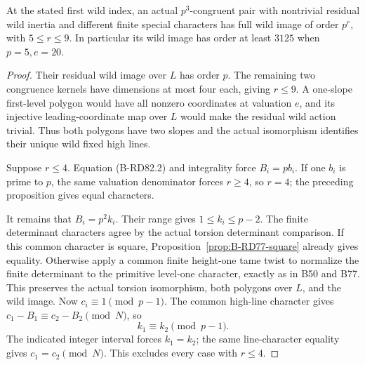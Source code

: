 \begin{theorem}
\label{thm:B-RD82}
At the stated first wild index, an actual \(p^3\)-congruent
pair with nontrivial residual wild inertia and different
finite special characters has full wild image of order
\(p^r\), with \(5\le r\le9\). In particular its wild
image has order at least \(3125\) when \(p=5,e=20\).
\end{theorem}
\begin{proof}
Their residual wild image over \(L\) has order \(p\).
The remaining two congruence kernels have dimensions at
most four each, giving \(r\le9\). A one-slope first-level
polygon would have all nonzero coordinates at valuation
\(e\), and its injective leading-coordinate map over \(L\)
would make the residual wild action trivial. Thus both
polygons have two slopes and the actual isomorphism
identifies their unique wild fixed high lines.

Suppose \(r\le4\). Equation (B-RD82.2) and integrality
force \(B_i=pb_i\). If one \(b_i\) is prime to \(p\),
the same valuation denominator forces \(r\ge4\), so
\(r=4\); the preceding proposition gives equal characters.

It remains that \(B_i=p^2k_i\). Their range gives
\(1\le k_i\le p-2\). The finite determinant characters
agree by the actual torsion determinant comparison.
If this common character is square,
Proposition~\ref{prop:B-RD77-square} already gives equality.
Otherwise apply a common finite height-one tame twist
to normalize the finite determinant to the primitive
level-one character, exactly as in B50 and B77.
This preserves the actual torsion isomorphism, both
polygons over \(L\), and the wild image. Now
\(c_i\equiv1\pmod{p-1}\). The common high-line character
gives \(c_1-B_1\equiv c_2-B_2\pmod N\), so
\[
                 k_1\equiv k_2\pmod{p-1}.             \tag{B-RD82.9}
\]
The indicated integer interval forces \(k_1=k_2\);
the same line-character equality gives \(c_1=c_2\pmod N\).
This excludes every case with \(r\le4\).
\end{proof}

